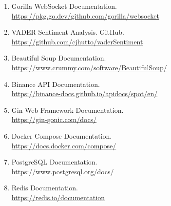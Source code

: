 \begin{enumerate}
        \item Gorilla WebSocket Documentation.\\
        \url{https://pkg.go.dev/github.com/gorilla/websocket}
        
        \item VADER Sentiment Analysis. GitHub.\\
        \url{https://github.com/cjhutto/vaderSentiment}
        
        \item Beautiful Soup Documentation.\\
        \url{https://www.crummy.com/software/BeautifulSoup/}
        
        \item Binance API Documentation.\\
        \url{https://binance-docs.github.io/apidocs/spot/en/}
        
        \item Gin Web Framework Documentation.\\
        \url{https://gin-gonic.com/docs/}
        
        \item Docker Compose Documentation.\\
        \url{https://docs.docker.com/compose/}
        
        \item PostgreSQL Documentation.\\
        \url{https://www.postgresql.org/docs/}
        
        \item Redis Documentation.\\
        \url{https://redis.io/documentation}
    \end{enumerate}

